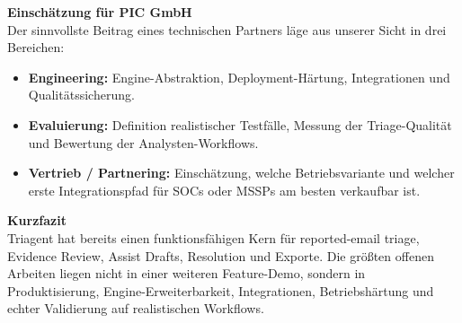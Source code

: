 \documentclass[10pt,a4paper]{article}
\begin{document}
\vspace{0.35em}
\noindent\textbf{Einschätzung für PIC GmbH}\\
Der sinnvollste Beitrag eines technischen Partners läge aus unserer Sicht in drei Bereichen:
\begin{itemize}
  \item \textbf{Engineering:} Engine-Abstraktion, Deployment-Härtung, Integrationen und Qualitätssicherung.
  \item \textbf{Evaluierung:} Definition realistischer Testfälle, Messung der Triage-Qualität und Bewertung der Analysten-Workflows.
  \item \textbf{Vertrieb / Partnering:} Einschätzung, welche Betriebsvariante und welcher erste Integrationspfad für SOCs oder MSSPs am besten verkaufbar ist.
\end{itemize}

\noindent\textbf{Kurzfazit}\\
Triagent hat bereits einen funktionsfähigen Kern für reported-email triage, Evidence Review, Assist Drafts, Resolution und Exporte. Die größten offenen Arbeiten liegen nicht in einer weiteren Feature-Demo, sondern in Produktisierung, Engine-Erweiterbarkeit, Integrationen, Betriebshärtung und echter Validierung auf realistischen Workflows.
\end{document}
